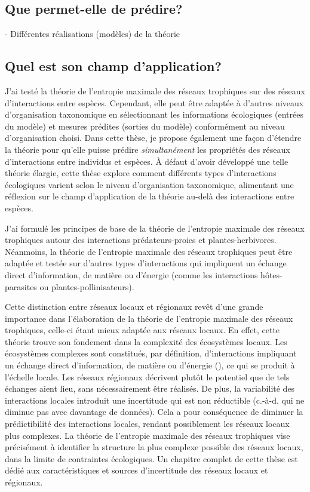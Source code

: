 \subsection{Que permet-elle de prédire?} 

- Différentes réalisations (modèles) de la théorie 

\subsection{Quel est son champ d'application?} 

J'ai testé la théorie de l'entropie maximale des réseaux trophiques sur des
réseaux d'interactions entre espèces. Cependant, elle peut être adaptée à
d'autres niveaux d'organisation taxonomique en sélectionnant les informations
écologiques (entrées du modèle) et mesures prédites (sorties du modèle)
conformément au niveau d'organisation choisi. Dans cette thèse, je propose
également une façon d'étendre la théorie pour qu'elle puisse prédire
\textit{simultanément} les propriétés des réseaux d'interactions entre individus
et espèces. À défaut d'avoir développé une telle théorie élargie, cette thèse
explore comment différents types d'interactions écologiques varient selon le
niveau d'organisation taxonomique, alimentant une réflexion sur le champ
d'application de la théorie au-delà des interactions entre espèces. 

J'ai formulé les principes de base de la théorie de l'entropie maximale des
réseaux trophiques autour des interactions prédateurs-proies et
plantes-herbivores. Néanmoins, la théorie de l'entropie maximale des réseaux
trophiques peut être adaptée et testée sur d'autres types d'interactions qui
impliquent un échange direct d'information, de matière ou d'énergie (comme les
interactions hôtes-parasites ou plantes-pollinisateurs).

Cette distinction entre réseaux locaux et régionaux revêt d'une grande
importance dans l'élaboration de la théorie de l'entropie maximale des réseaux
trophiques, celle-ci étant mieux adaptée aux réseaux locaux. En effet, cette
théorie trouve son fondement dans la complexité des écosystèmes locaux. Les
écosystèmes complexes sont constitués, par définition, d'interactions impliquant
un échange direct d'information, de matière ou d'énergie
(\cite{Ladyman2013What}), ce qui se produit à l'échelle locale. Les réseaux
régionaux décrivent plutôt le potentiel que de tels échanges aient lieu, sans
nécessairement être réalisés. De plus, la variabilité des interactions locales
introduit une incertitude qui est non réductible (c.-à-d. qui ne diminue pas
avec davantage de données). Cela a pour conséquence de diminuer la prédictibilité des
interactions locales, rendant possiblement les réseaux locaux plus complexes. La
théorie de l'entropie maximale des réseaux trophiques vise précisément à
identifier la structure la plus complexe possible des réseaux locaux, dans la
limite de contraintes écologiques. Un chapitre complet de cette thèse est dédié
aux caractéristiques et sources d'incertitude des réseaux locaux et régionaux.


